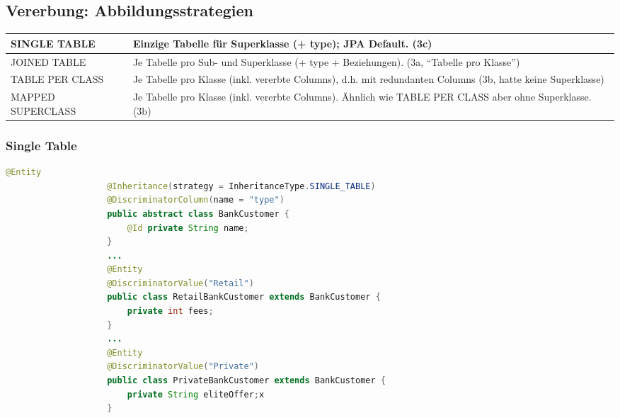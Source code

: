 \documentclass[a4paper, landscape, 8pt]{scrartcl}
\begin{document}
\begin{multicols*}{4}
        \subsection{Vererbung: Abbildungsstrategien}
        \begin{tabularx}{\columnwidth}{l | X}
            SINGLE TABLE & Einzige Tabelle für Superklasse (+ type); JPA Default. (3c) \\
            \hline
            JOINED TABLE & Je Tabelle pro Sub- und Superklasse (+ type + Beziehungen). (3a, \enquote{Tabelle pro Klasse}) \\
            \hline
            TABLE PER CLASS & Je Tabelle pro Klasse (inkl. vererbte Columns), d.h. mit redundanten Columns (3b, hatte keine Superklasse) \\
            \hline
            MAPPED SUPERCLASS & Je Tabelle pro Klasse (inkl. vererbte Columns). Ähnlich wie TABLE PER CLASS aber ohne Superklasse. (3b)
        \end{tabularx}

        \subsubsection{Single Table}
        \begin{lstlisting}[language=java]
                    @Entity
                    @Inheritance(strategy = InheritanceType.SINGLE_TABLE)
                    @DiscriminatorColumn(name = "type")
                    public abstract class BankCustomer {
                        @Id private String name;
                    }
                    ...
                    @Entity
                    @DiscriminatorValue("Retail")
                    public class RetailBankCustomer extends BankCustomer {
                        private int fees;
                    }
                    ...
                    @Entity
                    @DiscriminatorValue("Private")
                    public class PrivateBankCustomer extends BankCustomer {
                        private String eliteOffer;x
                    }
        \end{lstlisting}


\end{multicols*}
\end{document}
